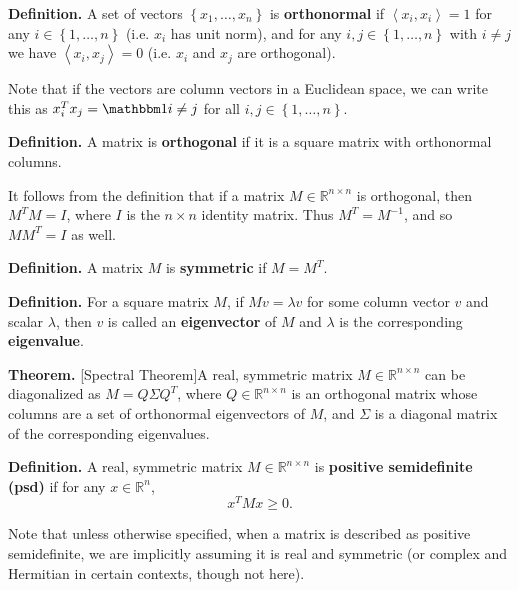\documentclass{article}
\theoremstyle{plain}
\theoremstyle{definition}
\begin{document}
{\bf Definition. }
A set of vectors $\left\{ x_{1},\ldots,x_{n}\right\} $ is \textbf{orthonormal}
if $\left\langle x_{i},x_{i}\right\rangle =1$ for any $i\in\left\{ 1,\ldots,n\right\} $
(i.e. $x_{i}$ has unit norm), and for any $i,j\in\left\{ 1,\ldots,n\right\} $
with $i\neq j$ we have $\left\langle x_{i},x_{j}\right\rangle =0$
(i.e. $x_{i}$ and $x_{j}$ are orthogonal).

Note that if the vectors are column vectors in a Euclidean space,
we can write this as $x_{i}^{T}x_{j}=\ind{i\neq j}$ for all $i,j\in\left\{ 1,\ldots,n\right\} $. 

{\bf Definition. }
A matrix is \textbf{orthogonal }if it is a square matrix with orthonormal
columns. 

It follows from the definition that if a matrix $M\in\mathbb{R}^{n\times n}$
is orthogonal, then $M^{T}M=I$, where $I$ is the $n\times n$ identity
matrix. Thus $M^{T}=M^{-1}$, and so $MM^{T}=I$ as well. 

{\bf Definition. }
A matrix $M$ is \textbf{symmetric }if $M=M^{T}$. 

{\bf Definition. }
For a square matrix $M$, if $Mv=\lambda v$ for some column vector
$v$ and scalar $\lambda$, then $v$ is called an \textbf{eigenvector}
of $M$ and $\lambda$ is the corresponding \textbf{eigenvalue}. 

{\bf Theorem. }
[Spectral Theorem]A real, symmetric matrix $M\in\mathbb{R}^{n\times n}$
can be diagonalized as $M=Q\Sigma Q^{T}$, where $Q\in\mathbb{R}^{n\times n}$
is an orthogonal matrix whose columns are a set of orthonormal eigenvectors
of $M$, and $\Sigma$ is a diagonal matrix of the corresponding eigenvalues. 

{\bf Definition. }
A real, symmetric matrix $M\in\mathbb{R}^{n\times n}$ is \textbf{positive
semidefinite (psd)} if for any $x\in\mathbb{R}^{n}$, 
\[
x^{T}Mx\ge0.
\]

Note that unless otherwise specified, when a matrix is described as
positive semidefinite, we are implicitly assuming it is real and symmetric
(or complex and Hermitian in certain contexts, though not here).
\end{document}

